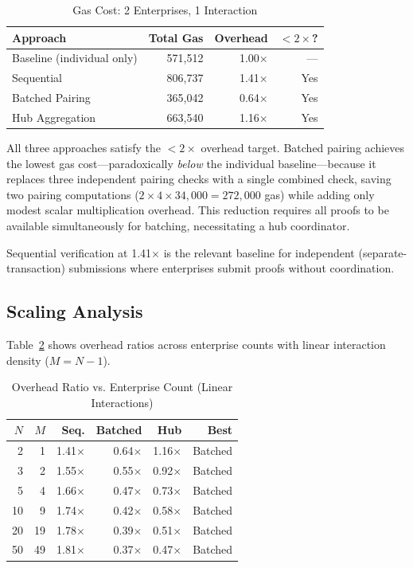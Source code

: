 \begin{table}[t]
\centering
\caption{Gas Cost: 2 Enterprises, 1 Interaction}
\label{tab:gas-primary}
\begin{tabular}{@{}lrrr@{}}
\toprule
Approach & Total Gas & Overhead & $< 2\times$? \\
\midrule
Baseline (individual only) & 571,512 & 1.00$\times$ & --- \\
Sequential & 806,737 & 1.41$\times$ & Yes \\
Batched Pairing & 365,042 & 0.64$\times$ & Yes \\
Hub Aggregation & 663,540 & 1.16$\times$ & Yes \\
\bottomrule
\end{tabular}
\end{table}

All three approaches satisfy the $< 2\times$ overhead target. Batched pairing
achieves the lowest gas cost---paradoxically \emph{below} the individual
baseline---because it replaces three independent pairing checks with a single
combined check, saving two pairing computations ($2 \times 4 \times 34{,}000
= 272{,}000$ gas) while adding only modest scalar multiplication overhead.
This reduction requires all proofs to be available simultaneously for batching,
necessitating a hub coordinator.

Sequential verification at 1.41$\times$ is the relevant baseline for
independent (separate-transaction) submissions where enterprises submit proofs
without coordination.

\subsection{Scaling Analysis}

Table~\ref{tab:scaling} shows overhead ratios across enterprise counts with
linear interaction density ($M = N - 1$).

\begin{table}[t]
\centering
\caption{Overhead Ratio vs. Enterprise Count (Linear Interactions)}
\label{tab:scaling}
\begin{tabular}{@{}rrrrrr@{}}
\toprule
$N$ & $M$ & Seq. & Batched & Hub & Best \\
\midrule
2 & 1 & 1.41$\times$ & 0.64$\times$ & 1.16$\times$ & Batched \\
3 & 2 & 1.55$\times$ & 0.55$\times$ & 0.92$\times$ & Batched \\
5 & 4 & 1.66$\times$ & 0.47$\times$ & 0.73$\times$ & Batched \\
10 & 9 & 1.74$\times$ & 0.42$\times$ & 0.58$\times$ & Batched \\
20 & 19 & 1.78$\times$ & 0.39$\times$ & 0.51$\times$ & Batched \\
50 & 49 & 1.81$\times$ & 0.37$\times$ & 0.47$\times$ & Batched \\
\bottomrule
\end{tabular}
\end{table}

